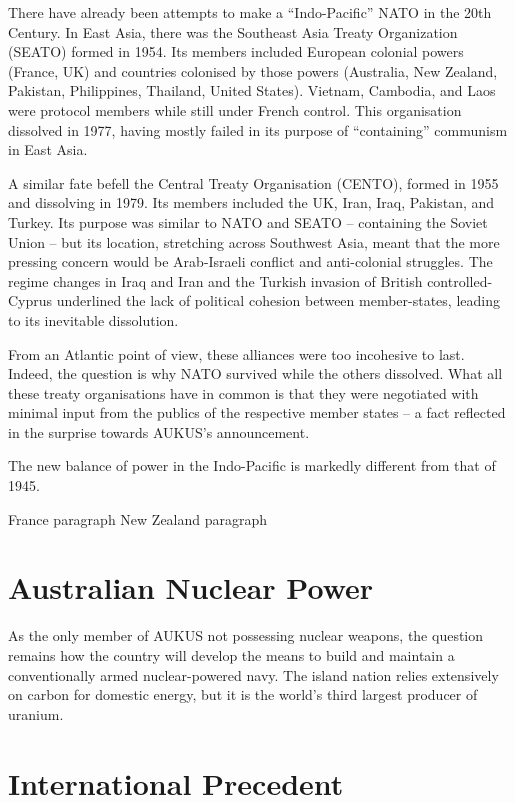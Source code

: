 \documentclass[letterpaper,12pt,twoside]{article} %
\begin{document}
\begin{multicols}{2}
There have already been attempts to make a ``Indo-Pacific'' NATO in the 20th Century. In East Asia, there was the Southeast Asia Treaty Organization (SEATO) formed in 1954. Its members included European colonial powers (France, UK) and countries colonised by those powers (Australia, New Zealand, Pakistan, Philippines, Thailand, United States). Vietnam, Cambodia, and Laos were protocol members while still under French control. This organisation dissolved in 1977, having mostly failed in its purpose of ``containing'' communism in East Asia.

A similar fate befell the Central Treaty Organisation (CENTO), formed in 1955 and dissolving in 1979. Its members included the UK, Iran, Iraq, Pakistan, and Turkey. Its purpose was similar to NATO and SEATO -- containing the Soviet Union -- but its location, stretching across Southwest Asia, meant that the more pressing concern would be Arab-Israeli conflict and anti-colonial struggles. The regime changes in Iraq and Iran and the Turkish invasion of British controlled-Cyprus underlined the lack of political cohesion between member-states, leading to its inevitable dissolution.

From an Atlantic point of view, these alliances were too incohesive to last. Indeed, the question is why NATO survived while the others dissolved. What all these treaty organisations have in common is that they were negotiated with minimal input from the publics of the respective member states -- a fact reflected in the surprise towards AUKUS's announcement.

The new balance of power in the Indo-Pacific is markedly different from that of 1945.

France paragraph
New Zealand paragraph


\section{Australian Nuclear Power}

As the only member of AUKUS not possessing nuclear weapons, the question remains how the country will develop the means to build and maintain a conventionally armed nuclear-powered navy. The island nation relies extensively on carbon for domestic energy, but it is the world's third largest producer of uranium.

\section{International Precedent}

\end{multicols}
  \pagebreak


\printbibliography[heading=bibintoc,title=Bibliography]


\end{document}
